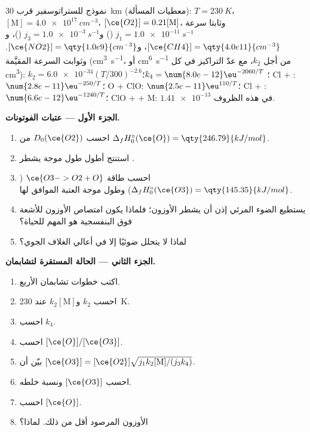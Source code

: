 \begin{problem}
\label{pb:b3:photochemistry:1}
نموذج للستراتوسفير قرب \qty{30}{km} (معطيات المسألة): $T = \qty{230}{K}$، $[\mathrm M] =
\qty{4.0e17}{cm^{-3}}$، $[\ce{O2}] = 0.21[\mathrm M]$، وثابتا سرعة  $j_1 = \qty{1.0e-11}{s^{-1}}$ ()
و$j_3 = \qty{1.0e-3}{s^{-1}}$ ()، و$[\ce{CH4}] = \qty{4.0e11}{cm^{-3}}$، و$[\ce{NO2}] = \qty{1.0e9}{cm^{-3}}$. وثوابت السرعة
المقيَّمة (\unit{cm^3.s^{-1}}، أو \unit{cm^6.s^{-1}} من أجل $k_2$، مع عدّ التراكيز في كل \unit{cm^3}):
$k_2 = \num{6.0e-34}(T/300)^{-2.6}$؛ $k_4 = \num{8.0e-12}\eu^{-2060/T}$؛ Cl + : $\num{2.8e-11}\eu^{-250/T}$؛
O + ClO: $\num{2.5e-11}\eu^{110/T}$؛ Cl + : $\num{6.6e-12}\eu^{-1240/T}$؛ ClO +  + M: $\num{1.41e-13}$ في
هذه الظروف.

\medskip\noindent\textbf{الجزء الأول --- عتبات الفوتونات.}
\begin{enumerate}
  \item احسب $D_0(\ce{O2})$ من $\Delta_fH^\circ_0(\ce{O}) = \qty{246.79}{kJ/mol}$.
  \item استنتج أطول طول موجة يشطر .
  \item احسب طاقة $\ce{O3 -> O2 + O}$ ($\Delta_fH^\circ_0(\ce{O3}) = \qty{145.35}{kJ/mol}$) وطول موجة
        العتبة الموافق لها.
  \item يستطيع الضوء المرئي إذن أن يشطر الأوزون؛ فلماذا يكون امتصاص الأوزون
        للأشعة فوق البنفسجية هو المهم للحياة؟
  \item لماذا لا يتحلل  ضوئيًا إلا في أعالي الغلاف الجوي؟
\end{enumerate}

\medskip\noindent\textbf{الجزء الثاني --- الحالة المستقرة لتشابمان.}
\begin{enumerate}[resume]
  \item اكتب خطوات تشابمان الأربع.
  \item احسب $k_2$ و$k_2[\mathrm M]$ عند \qty{230}{K}.
  \item احسب $k_4$.
  \item احسب $[\ce{O}]/[\ce{O3}]$.
  \item بيّن أن $[\ce{O3}] = [\ce{O2}]\sqrt{j_1k_2[\mathrm M]/(j_3k_4)}$.
  \item احسب $[\ce{O3}]$ ونسبة خلطه.
  \item احسب $[\ce{O}]$.
  \item الأوزون المرصود أقل من ذلك. لماذا؟
\end{enumerate}


\end{problem}

